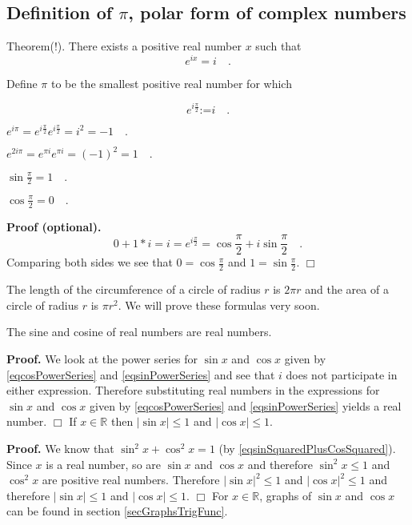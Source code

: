 \documentclass[12pt]{book}
\newcommand{\eqdef}{\textbf{:=}}
\newcommand{\importantFormula}[1]{\begin{equation} \boxed{#1} \end{equation}}
\newenvironment{proof}[1][]{ \textbf{Proof#1.} }{$\Box$\medskip}
\newenvironment{proofOptional}[1][]{ \textbf{Proof (optional).}}{$\Box$\medskip}
\begin{document}
\subsection{Definition of $\pi$, polar form of complex numbers}\label{secPolarFormComplexNumbers}
\label{secDefinitionPi}

Theorem(!). There exists a positive real number $x$ such that \index{$\pi$}
\importantFormula{
e^{ix}=i\quad .
}

Define $\pi$ to be the smallest positive real number for which

\importantFormula{
e^{i\frac{\pi}{2} }\eqdef i\quad .
}

$e^{i\pi}= e^{i\frac{\pi}2}e^{i\frac{\pi}2}= i^2= -1\quad .$

$e^{2i\pi}= e^{\pi i} e^{\pi i}= (-1)^2=1\quad .$

$\sin \frac{\pi}2 = 1\quad .$

$\cos \frac{\pi}2 = 0\quad .$

\begin{proofOptional}
\[
0+ 1*i=i=e^{i\frac{\pi}2}= \cos \frac{\pi}2 + i\sin \frac\pi 2\quad .
\]
Comparing both sides we see that $0=\cos \frac{\pi}{2}$ and $1=\sin \frac \pi 2$.
\end{proofOptional}

The length of the circumference of a circle of radius $r$ is $2\pi r$ and the area of a circle of radius $r$ is $\pi r^2$. We will prove these formulas very soon. 

The sine and cosine of real numbers are real numbers.

\begin{proof}
We look at the power series for $\sin x$ and $\cos x$ given by \eqref{eqcosPowerSeries} and \eqref{eqsinPowerSeries} and see that $i$ does not participate in either expression. Therefore substituting real numbers in the expressions for $\sin x$ and $\cos x$ given by  \eqref{eqcosPowerSeries} and \eqref{eqsinPowerSeries} yields a real number.
\end{proof}
If $x\in \mathbb R$ then $|\sin x|\leq 1$ and $|\cos x| \leq 1$.

\begin{proof}
We know that $\sin^2 x+\cos ^2 x=1$ (by \eqref{eqsinSquaredPlusCosSquared}). Since $x$ is a real number, so are $\sin x$ and $\cos x$ and therefore $\sin^2x\leq 1$ and $\cos^2 x$ are positive real numbers. Therefore  $|\sin x|^2\leq 1$ and $|\cos x|^2\leq 1$ and therefore $|\sin x|\leq 1$ and $|\cos x|\leq 1$.
\end{proof}
For $x\in \mathbb R$, graphs of $\sin x$ and $\cos x$ can be found in section \ref{secGraphsTrigFunc}.
\end{document}
